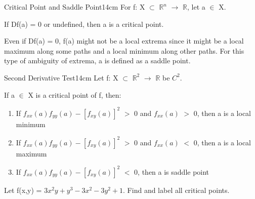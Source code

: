     \vspace{0.5cm}



    \begin{definition}{Critical Point and Saddle Point}{14cm}
        For f: X $\subset$ $\mathbb{R}^n$ $\rightarrow$ $\mathbb{R}$,
        let a $\in$ X.

        If Df(a) = 0 or undefined, then a is a {\color{lblue} critical point}.

        \vspace{0.3cm}

        Even if Df(a) = 0, f(a) might not be a local extrema
        since it might be a local maximum along some paths and
        a local minimum along other paths.
        For this type of ambiguity of extrema, a is defined as a
        {\color{lblue} saddle point}. 
    \end{definition}

    \vspace{0.5cm}



    \begin{wtheorem}{Second Derivative Test}{14cm}
        Let f: X $\subset$ $\mathbb{R}^2$ $\rightarrow$ $\mathbb{R}$
        be $C^2$.

        If a $\in$ X is a critical point of f, then:

        \begin{enumerate}[label=(\alph*), leftmargin=1cm, itemsep=0.1cm]
            \item If $f_{xx}(a)f_{yy}(a) - [f_{xy}(a)]^2$ $>$ 0 and
                $f_{xx}(a)$ $>$ 0, then a is a local minimum

            \item If $f_{xx}(a)f_{yy}(a) - [f_{xy}(a)]^2$ $>$ 0 and
                $f_{xx}(a)$ $<$ 0, then a is a local maximum

            \item If $f_{xx}(a)f_{yy}(a) - [f_{xy}(a)]^2$ $<$ 0,
                then a is saddle point
        \end{enumerate}
    \end{wtheorem}

    \vspace{0.5cm}



    \begin{example}
        Let f(x,y) = $3x^2y + y^3 - 3x^2 - 3y^2 + 1$.
        Find and label all critical points.
    \end{example}

